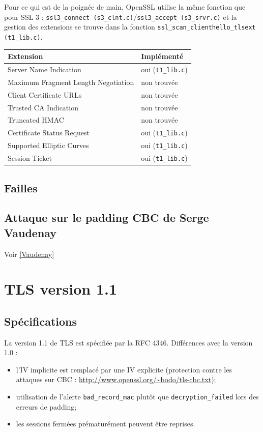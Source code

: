 \documentclass[a4paper,11pt,french]{article}
\begin{document}
Pour ce qui est de la poignée de main, OpenSSL utilise la même fonction que pour SSL 3 : \verb+ssl3_connect (s3_clnt.c)+/\verb+ssl3_accept (s3_srvr.c)+ et la gestion des extensions se trouve dans la fonction \verb+ssl_scan_clienthello_tlsext (t1_lib.c)+.

\begin{center}
\begin{tabularx}{16cm}{|X|l|}
\hline
\textbf{Extension}&\textbf{Implémenté}\\ \hline
Server Name Indication& oui (\verb+t1_lib.c+)\\ \hline
Maximum Fragment Length Negotiation& non trouvée\\ \hline
Client Certificate URLs& non trouvée\\ \hline
Trusted CA Indication& non trouvée\\ \hline
Truncated HMAC & non trouvée\\ \hline
Certificate Status Request& oui (\verb+t1_lib.c+)\\ \hline
Supported Elliptic Curves& oui (\verb+t1_lib.c+)\\ \hline
Session Ticket& oui (\verb+t1_lib.c+)\\ \hline
\end{tabularx}
\end{center}


\subsection{Failles}
\subsection{Attaque sur le padding CBC de Serge Vaudenay}
Voir \ref{Vaudenay}
\pagebreak
\section{TLS version 1.1}
\subsection{Spécifications}

La version 1.1 de TLS est spécifiée par la RFC 4346. Différences avec la version 1.0 :
\begin{itemize}
\item l'IV implicite est remplacé par une IV explicite (protection contre les attaques sur CBC : \url{http://www.openssl.org/~bodo/tls-cbc.txt});
\item utilisation de l'alerte \verb+bad_record_mac+ plutôt que \verb+decryption_failed+ lors des erreurs de padding;
\item les sessions fermées prématurément peuvent être reprises.
\end{itemize}
\end{document}
